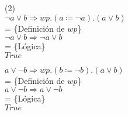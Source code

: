 \documentclass[12pt]{article}
\begin{document}
\begin{itemize}
    \bigbreak

    (2)\\
    $\neg a \lor b \Rightarrow wp.(a \coloneqq \neg a).(a \lor b)$\\
    = \{Definición de $wp$\}\\
    $\neg a \lor b \Rightarrow \neg a \lor b$\\
    = \{Lógica\}\\
    $True$

    $a \lor \neg b \Rightarrow wp.(b \coloneqq \neg b).(a \lor b)$\\
    = \{Definición de $wp$\}\\
    $a \lor \neg b \Rightarrow a \lor \neg b$\\
    = \{Lógica\}\\
    $True$

\end{itemize}
\end{document}
